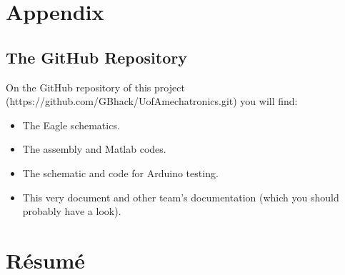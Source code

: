 \documentclass[12pt]{article}
\begin{document}
\newpage
\section{Appendix}

	\subsection{The GitHub Repository}

		On the GitHub repository of this project (https://github.com/GBhack/UofAmechatronics.git) you will find:
		\begin{itemize}
			\item The Eagle schematics.
			\item The assembly and Matlab codes.
			\item The schematic and code for Arduino testing.
			\item This very document and other team's documentation (which you should probably have a look).
		\end{itemize}


\newpage
\section{Résumé}
\end{document}
